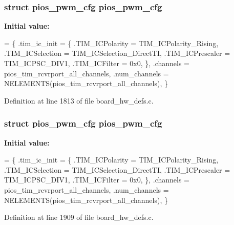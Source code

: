 \hypertarget{group___tau_labs_core_ga7587f8e174df90bef8cec1edfa9e14c1}{
\subsubsection[{pios\-\_\-pwm\-\_\-cfg}]{\setlength{\rightskip}{0pt plus 5cm}struct {\bf pios\-\_\-pwm\-\_\-cfg} {\bf pios\-\_\-pwm\-\_\-cfg}}}\label{group___tau_labs_core_ga7587f8e174df90bef8cec1edfa9e14c1}
{\bfseries Initial value\-:}
\begin{DoxyCode}
= \{
        .tim\_ic\_init = \{
                .TIM\_ICPolarity = TIM\_ICPolarity\_Rising,
                .TIM\_ICSelection = TIM\_ICSelection\_DirectTI,
                .TIM\_ICPrescaler = TIM\_ICPSC\_DIV1,
                .TIM\_ICFilter = 0x0,
        \},
        .channels = pios\_tim\_rcvrport\_all\_channels,
        .num\_channels = NELEMENTS(pios\_tim\_rcvrport\_all\_channels),
\}
\end{DoxyCode}


Definition at line 1813 of file board\-\_\-hw\-\_\-defs.\-c.

\hypertarget{group___tau_labs_core_ga7587f8e174df90bef8cec1edfa9e14c1}{
\subsubsection[{pios\-\_\-pwm\-\_\-cfg}]{\setlength{\rightskip}{0pt plus 5cm}struct {\bf pios\-\_\-pwm\-\_\-cfg} {\bf pios\-\_\-pwm\-\_\-cfg}}}\label{group___tau_labs_core_ga7587f8e174df90bef8cec1edfa9e14c1}
{\bfseries Initial value\-:}
\begin{DoxyCode}
= \{
        .tim\_ic\_init = \{
                .TIM\_ICPolarity = TIM\_ICPolarity\_Rising,
                .TIM\_ICSelection = TIM\_ICSelection\_DirectTI,
                .TIM\_ICPrescaler = TIM\_ICPSC\_DIV1,
                .TIM\_ICFilter = 0x0,
        \},
        .channels = pios\_tim\_rcvrport\_all\_channels,
        .num\_channels = NELEMENTS(pios\_tim\_rcvrport\_all\_channels),
\}
\end{DoxyCode}


Definition at line 1909 of file board\-\_\-hw\-\_\-defs.\-c.

